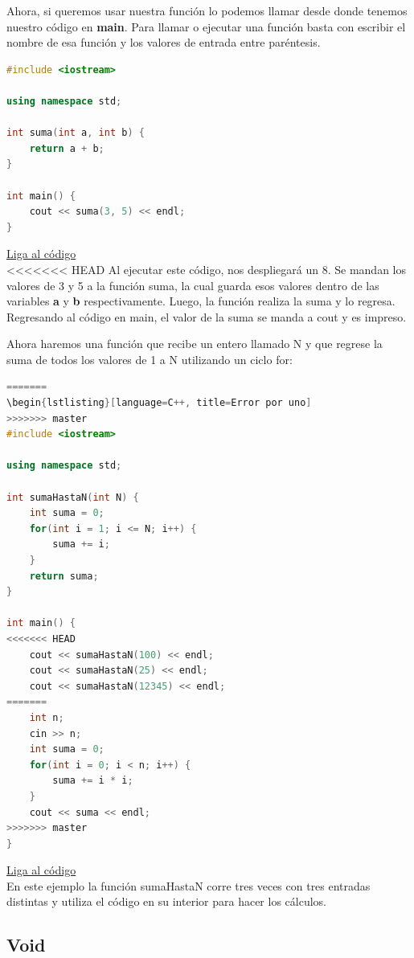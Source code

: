 \documentclass{article}
\begin{document}
Ahora, si queremos usar nuestra función lo podemos llamar desde donde tenemos nuestro código en \textbf{main}. Para llamar o ejecutar una función basta con escribir el nombre de esa función y los valores de entrada entre paréntesis.

\begin{lstlisting}[language=C++, title=Función de suma]
#include <iostream>

using namespace std;

int suma(int a, int b) {
	return a + b;
}

int main() {
	cout << suma(3, 5) << endl;
}
\end{lstlisting}
\href{https://repl.it/@Jamesscn/Funciones}{Liga al código}\\

<<<<<<< HEAD
Al ejecutar este código, nos despliegará un 8. Se mandan los valores de 3 y 5 a la función suma, la cual guarda esos valores dentro de las variables \textbf{a} y \textbf{b} respectivamente. Luego, la función realiza la suma y lo regresa. Regresando al código en main, el valor de la suma se manda a cout y es impreso.

Ahora haremos una función que recibe un entero llamado N y que regrese la suma de todos los valores de 1 a N utilizando un ciclo for:

\begin{lstlisting}[language=C++, title=Función de suma gaussiana]
=======
\begin{lstlisting}[language=C++, title=Error por uno]
>>>>>>> master
#include <iostream>

using namespace std;

int sumaHastaN(int N) {
	int suma = 0;
	for(int i = 1; i <= N; i++) {
		suma += i;
	}
	return suma;
}

int main() {
<<<<<<< HEAD
	cout << sumaHastaN(100) << endl;
	cout << sumaHastaN(25) << endl;
	cout << sumaHastaN(12345) << endl;
=======
	int n;
	cin >> n;
	int suma = 0;
	for(int i = 0; i < n; i++) {
		suma += i * i;
	}
	cout << suma << endl;
>>>>>>> master
}
\end{lstlisting}
\href{https://repl.it/@Jamesscn/Funciones}{Liga al código} \\

En este ejemplo la función sumaHastaN corre tres veces con tres entradas distintas y utiliza el código en su interior para hacer los cálculos.

\subsection{Void}
\end{document}

